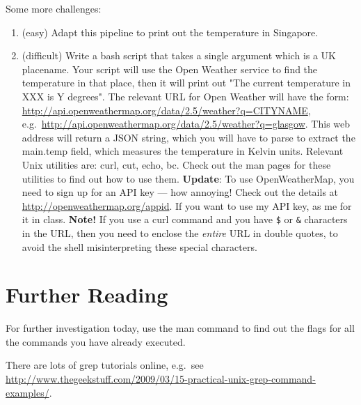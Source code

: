 \documentclass{article}
\begin{document}
Some more challenges:
\begin{enumerate}
\item (easy) Adapt this pipeline to print out the temperature in Singapore.
\item (difficult) Write a bash script that takes a single argument which is a UK placename. Your script will use the Open Weather service to find the temperature in that place, then it will print out "The current temperature in XXX is Y degrees".
The relevant URL for Open Weather will have the form:
\url{http://api.openweathermap.org/data/2.5/weather?q=CITYNAME}, e.g.\
\url{http://api.openweathermap.org/data/2.5/weather?q=glasgow}.
This web address will return a JSON string, which you will have to parse to extract the main.temp field, which measures the temperature in Kelvin units.
Relevant Unix utilities are: \textsf{curl}, \textsf{cut}, \textsf{echo}, \textsf{bc}. Check out the man pages for these utilities to find out how to use them. \textbf{Update}: To use OpenWeatherMap, you need to sign up for an API key --- how annoying! Check out the details at \url{http://openweathermap.org/appid}. If you want to use my API key, as me for it in class. \textbf{Note!} If you use a curl command and you have \verb+$+ or \verb+&+ characters in the URL, then you need to enclose the \textit{entire} URL in double quotes, to avoid the shell misinterpreting these special characters.
\end{enumerate}

\section*{Further Reading}

For further investigation today, use the man command to find out 
the flags for all the commands you have already executed.

There are lots of grep tutorials online, e.g.\ see \url{http://www.thegeekstuff.com/2009/03/15-practical-unix-grep-command-examples/}.
\end{document}
